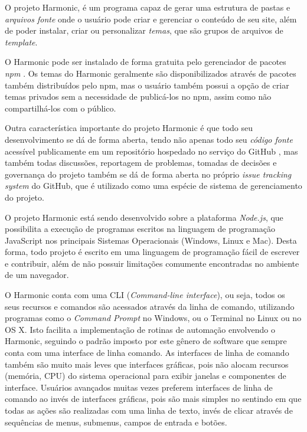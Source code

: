 \documentclass[ppginf, pep]{esinucpel}
\begin{document}
O projeto Harmonic, é um programa capaz de gerar uma estrutura de pastas e \emph{arquivos fonte} onde o usuário pode criar e gerenciar o conteúdo de seu site, além de poder instalar, criar ou personalizar \emph{temas}, que são grupos de arquivos de \textit{template}.

O Harmonic pode ser instalado de forma gratuita pelo gerenciador de pacotes \emph{npm} \cite{npm}. Os temas do Harmonic geralmente são disponibilizados através de pacotes também distribuídos pelo npm, mas o usuário também possui a opção de criar temas privados sem a necessidade de publicá-los no npm, assim como não compartilhá-los com o público.

Outra característica importante do projeto Harmonic é que todo seu desenvolvimento se dá de forma aberta, tendo não apenas todo seu \emph{código fonte} acessível publicamente em um repositório hospedado no serviço do GitHub \cite{github}, mas também todas discussões, reportagem de problemas, tomadas de decisões e governança do projeto também se dá de forma aberta no próprio \textit{issue tracking system} do GitHub, que é utilizado como uma espécie de sistema de gerenciamento do projeto.

O projeto Harmonic está sendo desenvolvido sobre a plataforma \emph{Node.js}, que possibilita a execução de programas escritos na linguagem de programação JavaScript nos principais Sistemas Operacionais (Windows, Linux e Mac). Desta forma, todo projeto é escrito em uma linguagem de programação fácil de escrever e contribuir, além de não possuir limitações comumente encontradas no ambiente de um navegador.

O Harmonic conta com uma CLI (\textit{Command-line interface}), ou seja, todos os seus recursos e comandos são acessados através da linha de comando, utilizando programas como o \textit{Command Prompt} no Windows, ou o Terminal no Linux ou no OS X. Isto facilita a implementação de rotinas de automação envolvendo o Harmonic, seguindo o padrão imposto por este gênero de software que sempre conta com uma interface de linha comando. As interfaces de linha de comando também são muito mais leves que interfaces gráficas, pois não alocam recursos (memória, CPU) do sistema operacional para exibir janelas e componentes de interface. Usuários avançados muitas vezes preferem interfaces de linha de comando ao invés de interfaces gráficas, pois são mais simples no sentindo em que todas as ações são realizadas com uma linha de texto, invés de clicar através de sequências de menus, submenus, campos de entrada e botões.
\end{document}
